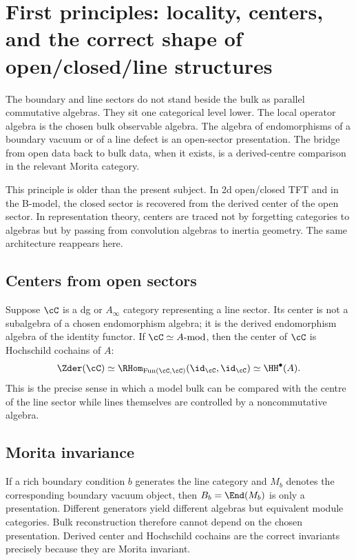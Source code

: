 \section{First principles: locality, centers, and the correct shape of open/closed/line structures}\label{sec:first-principles}

The boundary and line sectors do not stand beside the bulk as parallel
commutative algebras. They sit one categorical level lower. The local
operator algebra is the chosen bulk observable algebra. The algebra of
endomorphisms of a boundary vacuum or of a line defect is an open-sector
presentation. The bridge from open data back to bulk data, when it
exists, is a derived-centre comparison in the relevant Morita category.

This principle is older than the present subject. In 2d open/closed TFT and in the B-model, the closed sector is recovered from the derived center of the open sector. In representation theory, centers are traced not by forgetting categories to algebras but by passing from convolution algebras to inertia geometry. The same architecture reappears here.

\subsection{Centers from open sectors}

Suppose $\cC$ is a dg or $A_\infty$ category representing a line sector. Its center is not a subalgebra of a chosen endomorphism algebra; it is the derived endomorphism algebra of the identity functor. If $\cC\simeq A\text{-mod}$, then the center of $\cC$ is Hochschild cochains of $A$:
\[
\Zder(\cC)\simeq \RHom_{\operatorname{Fun}(\cC,\cC)}(\id_{\cC},\id_{\cC})\simeq \HH^\bullet(A).
\]
This is the precise sense in which a model bulk can be compared with
the centre of the line sector while lines themselves are controlled by
a noncommutative algebra.

\subsection{Morita invariance}

If a rich boundary condition $b$ generates the line category and $M_b$ denotes the corresponding boundary vacuum object, then $B_b=\End(M_b)$ is only a presentation. Different generators yield different algebras but equivalent module categories. Bulk reconstruction therefore cannot depend on the chosen presentation. Derived center and Hochschild cochains are the correct invariants precisely because they are Morita invariant.

